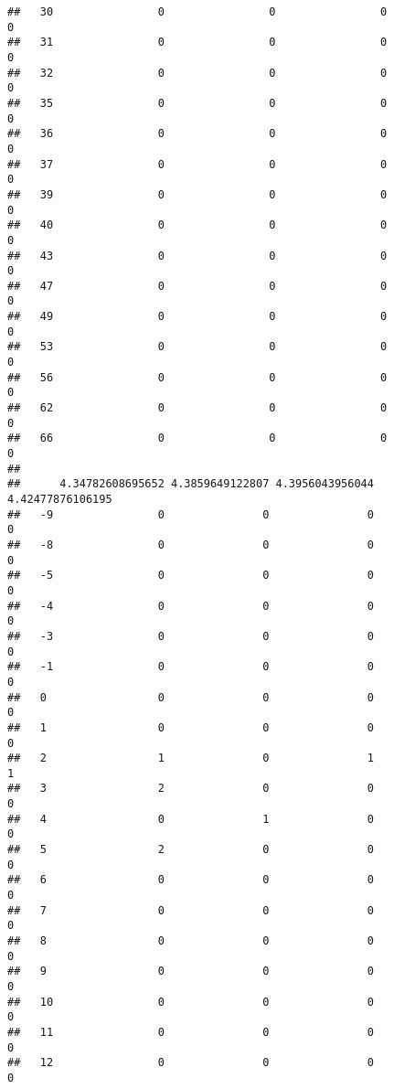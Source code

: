 \documentclass[]{article}
\begin{document}
\begin{verbatim}
##   30                0                0                0               0
##   31                0                0                0               0
##   32                0                0                0               0
##   35                0                0                0               0
##   36                0                0                0               0
##   37                0                0                0               0
##   39                0                0                0               0
##   40                0                0                0               0
##   43                0                0                0               0
##   47                0                0                0               0
##   49                0                0                0               0
##   53                0                0                0               0
##   56                0                0                0               0
##   62                0                0                0               0
##   66                0                0                0               0
##     
##      4.34782608695652 4.3859649122807 4.3956043956044 4.42477876106195
##   -9                0               0               0                0
##   -8                0               0               0                0
##   -5                0               0               0                0
##   -4                0               0               0                0
##   -3                0               0               0                0
##   -1                0               0               0                0
##   0                 0               0               0                0
##   1                 0               0               0                0
##   2                 1               0               1                1
##   3                 2               0               0                0
##   4                 0               1               0                0
##   5                 2               0               0                0
##   6                 0               0               0                0
##   7                 0               0               0                0
##   8                 0               0               0                0
##   9                 0               0               0                0
##   10                0               0               0                0
##   11                0               0               0                0
##   12                0               0               0                0

\end{verbatim}
\end{document}

